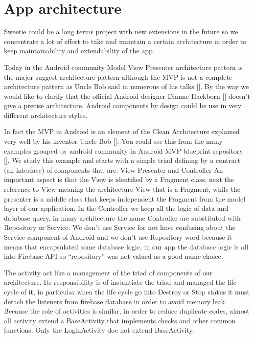 
\section{App architecture}
\label{sec:app-architecture}

Sweetie could be a long terms project with new extensions in the future so we concentrate a lot of effort to take and maintain a certain architecture in order to keep maintainability and extendability of the app.

Today in the Android community Model View Presenter architecture pattern is the major suggest architecture pattern although the MVP is not a complete architecture pattern as Uncle Bob said in numerous of his talks [].  By the way we would like to clarify that the official Android designer Dianne Hackborn [] doesn’t give a precise architecture, Android components by design could be use in very different architecture styles.

In fact the MVP in Android is an element of the Clean Architecture explained very well by his inventor Uncle Bob []. You could see this from the many examples grouped by android community in Android MVP blueprint repository []. We study this example and starts with a simple triad defining by a contract (an interface) of components that are:
View Presenter and Controller
An important aspect is that the View is identified by a Fragment class, next the reference to View meaning the architecture View that is a Fragment, while the presenter is a middle class that keeps independent the Fragment from the model layer of our application. In the Controller we keep all the logic of data and database query, in many architecture the name Controller are substituted with Repository or Service. We don’t use Service for not have confusing about the Service component of Android and we don’t use Repository word because it means that encapsulated some database logic, in our app the database logic is all into Firebase API so “repository” was not valued as a good name choice. 

The activity act like a management of the triad of components of our architecture.
Its responsibility is of instantiate the triad and managed the life cycle of it, in particular when the life cycle go into Destroy or Stop status it must detach the listeners from firebase database in order to avoid memory leak. Because the role of activities is similar, in order to reduce duplicate codes, almost all activity extend a BaseActivity that implements checks and other common functions. Only the LoginActivity doe not extend BaseActivity.

